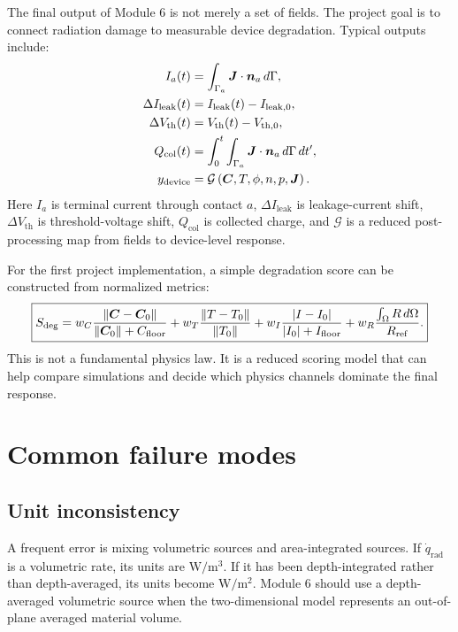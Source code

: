 \documentclass[11pt]{article}
\newcommand{\Jvec}{\bm{J}}
\newcommand{\Cvec}{\bm{C}}
\newcommand{\OmegaD}{\Omega}
\begin{document}
The final output of Module 6 is not merely a set of fields. The project goal is to connect radiation damage to measurable device degradation. Typical outputs include:
\begin{align}
I_a(t) &= \int_{\Gamma_a}\Jvec\cdot\nvec_a\,d\Gamma, \\
\Delta I_{\mathrm{leak}}(t) &= I_{\mathrm{leak}}(t)-I_{\mathrm{leak},0}, \\
\Delta V_{\mathrm{th}}(t) &= V_{\mathrm{th}}(t)-V_{\mathrm{th},0}, \\
Q_{\mathrm{col}}(t) &= \int_0^t\int_{\Gamma_a}\Jvec\cdot\nvec_a\,d\Gamma\,dt', \\
y_{\mathrm{device}} &= \mathcal{G}\left(\Cvec,T,\phi,n,p,\Jvec\right).
\end{align}
Here \(I_a\) is terminal current through contact \(a\), \(\Delta I_{\mathrm{leak}}\) is leakage-current shift, \(\Delta V_{\mathrm{th}}\) is threshold-voltage shift, \(Q_{\mathrm{col}}\) is collected charge, and \(\mathcal{G}\) is a reduced post-processing map from fields to device-level response.

For the first project implementation, a simple degradation score can be constructed from normalized metrics:
\begin{equation}
\boxed{
S_{\mathrm{deg}}
=w_C\frac{\norm{\Cvec-\Cvec_0}}{\norm{\Cvec_0}+C_{\mathrm{floor}}}
+w_T\frac{\norm{T-T_0}}{\norm{T_0}}
+w_I\frac{|I-I_0|}{|I_0|+I_{\mathrm{floor}}}
+w_R\frac{\int_{\OmegaD}R\,d\Omega}{R_{\mathrm{ref}}}.}
\label{eq:degradation_score}
\end{equation}
This is not a fundamental physics law. It is a reduced scoring model that can help compare simulations and decide which physics channels dominate the final response.

\section{Common failure modes}

\subsection{Unit inconsistency}

A frequent error is mixing volumetric sources and area-integrated sources. If \(\dot{q}_{\mathrm{rad}}\) is a volumetric rate, its units are \(\mathrm{W/m^3}\). If it has been depth-integrated rather than depth-averaged, its units become \(\mathrm{W/m^2}\). Module 6 should use a depth-averaged volumetric source when the two-dimensional model represents an out-of-plane averaged material volume.
\end{document}
